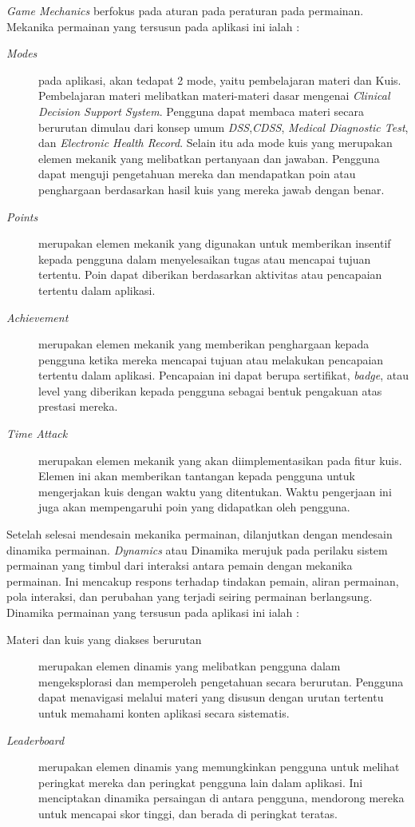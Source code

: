 \textit{Game Mechanics} berfokus pada aturan pada peraturan pada permainan. Mekanika permainan yang tersusun pada aplikasi ini ialah :
\begin{description}
	\item[\textit{Modes}]
	pada aplikasi, akan tedapat 2 mode, yaitu pembelajaran materi dan Kuis.
	Pembelajaran materi melibatkan materi-materi dasar mengenai \textit{Clinical Decision Support System}. Pengguna dapat membaca materi secara berurutan dimulau dari konsep umum \textit{DSS},\textit{CDSS}, \textit{Medical Diagnostic Test}, dan \textit{Electronic Health Record}.
	Selain itu ada mode kuis yang
	merupakan elemen mekanik yang melibatkan pertanyaan dan jawaban. Pengguna dapat menguji pengetahuan mereka dan mendapatkan poin atau penghargaan berdasarkan hasil kuis yang mereka jawab dengan benar.
	\item[\textit{Points}] merupakan elemen mekanik yang digunakan untuk memberikan insentif kepada pengguna dalam menyelesaikan tugas atau mencapai tujuan tertentu. Poin dapat diberikan berdasarkan aktivitas atau pencapaian tertentu dalam aplikasi.
	\item[\textit{Achievement}] merupakan elemen mekanik yang memberikan penghargaan kepada pengguna ketika mereka mencapai tujuan atau melakukan pencapaian tertentu dalam aplikasi. Pencapaian ini dapat berupa sertifikat, \textit{badge}, atau level yang diberikan kepada pengguna sebagai bentuk pengakuan atas prestasi mereka.
	\item[\textit{Time Attack}] merupakan elemen mekanik yang akan diimplementasikan pada fitur kuis. Elemen ini akan memberikan tantangan kepada pengguna untuk mengerjakan kuis dengan waktu yang ditentukan. Waktu pengerjaan ini juga akan mempengaruhi poin yang didapatkan oleh pengguna.
\end{description}
Setelah selesai mendesain mekanika permainan, dilanjutkan dengan mendesain dinamika permainan. \textit{Dynamics} atau Dinamika merujuk pada perilaku sistem permainan yang timbul dari interaksi antara pemain dengan mekanika permainan. Ini mencakup respons terhadap tindakan pemain, aliran permainan, pola interaksi, dan perubahan yang terjadi seiring permainan berlangsung. Dinamika permainan yang tersusun pada aplikasi ini ialah : 
\begin{description}
	\item[{Materi dan kuis yang diakses berurutan}] merupakan elemen dinamis yang melibatkan pengguna dalam mengeksplorasi dan memperoleh pengetahuan secara berurutan. Pengguna dapat menavigasi melalui materi yang disusun dengan urutan tertentu untuk memahami konten aplikasi secara sistematis.
	\item[\textit{Leaderboard}] merupakan elemen dinamis yang memungkinkan pengguna untuk melihat peringkat mereka dan peringkat pengguna lain dalam aplikasi. Ini menciptakan dinamika persaingan di antara pengguna, mendorong mereka untuk mencapai skor tinggi, dan berada di peringkat teratas.
\end{description}
